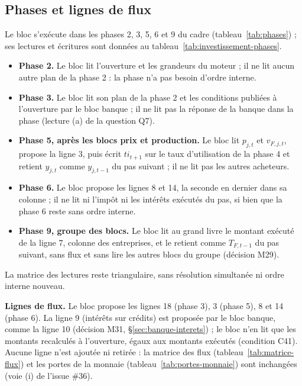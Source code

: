\documentclass[11pt,a4paper]{article}
\begin{document}
\subsection{Phases et lignes de flux}
\label{sec:investissement-phases}
\begin{proposee}
Le bloc s'exécute dans les phases 2, 3, 5, 6 et 9 du cadre (tableau~\ref{tab:phases}) ; ses lectures et écritures sont données au tableau~\ref{tab:investissement-phases}.
\begin{itemize}
\item \textbf{Phase 2.} Le bloc lit l'ouverture et les grandeurs du moteur ; il ne lit aucun autre plan de la phase 2 : la phase n'a pas besoin d'ordre interne.
\item \textbf{Phase 3.} Le bloc lit son plan de la phase 2 et les conditions publiées à l'ouverture par le bloc banque ; il ne lit pas la réponse de la banque dans la phase (lecture (a) de la question Q7).
\item \textbf{Phase 5, après les blocs prix et production.} Le bloc lit $p_{j,t}$ et $v_{F,j,t}$, propose la ligne 3, puis écrit $\mathit{ti}_{t+1}$ sur le taux d'utilisation de la phase 4 et retient $y_{j,t}$ comme $y_{j,t-1}$ du pas suivant ; il ne lit pas les autres acheteurs.
\item \textbf{Phase 6.} Le bloc propose les lignes 8 et 14, la seconde en dernier dans sa colonne ; il ne lit ni l'impôt ni les intérêts exécutés du pas, si bien que la phase 6 reste sans ordre interne.
\item \textbf{Phase 9, groupe des blocs.} Le bloc lit au grand livre le montant exécuté de la ligne 7, colonne des entreprises, et le retient comme $T_{F,t-1}$ du pas suivant, sans flux et sans lire les autres blocs du groupe (décision M29).
\end{itemize}
La matrice des lectures reste triangulaire, sans résolution simultanée ni ordre interne nouveau.

\textbf{Lignes de flux.} Le bloc propose les lignes 18 (phase 3), 3 (phase 5), 8 et 14 (phase 6). La ligne 9 (intérêts sur crédits) est proposée par le bloc banque, comme la ligne 10 (décision M31, \S\ref{sec:banque-interets}) ; le bloc n'en lit que les montants recalculés à l'ouverture, égaux aux montants exécutés (condition C41). Aucune ligne n'est ajoutée ni retirée : la matrice des flux (tableau~\ref{tab:matrice-flux}) et les portes de la monnaie (tableau~\ref{tab:portes-monnaie}) sont inchangées (voie (i) de l'issue \#36).


\end{proposee}
\end{document}
